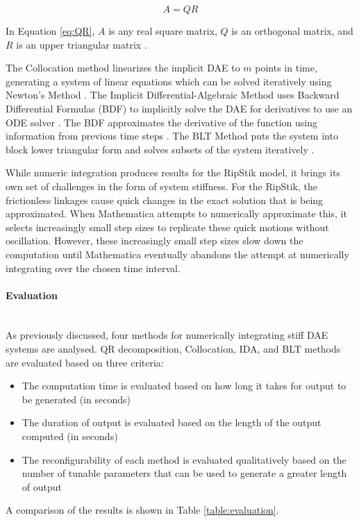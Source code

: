 \begin{equation}
\label{eq:QR}
A = QR
\end{equation}

In Equation \ref{eq:QR}, $A$ is any real square matrix, $Q$ is an orthogonal matrix, and $R$ is an upper triangular matrix \cite{Methods}.

The Collocation method linearizes the implicit DAE to $m$ points in time, generating a system of linear equations which can be solved iteratively using Newton's Method \cite{Methods}.
The Implicit Differential-Algebraic Method uses Backward Differential Formulas (BDF) to implicitly solve the DAE for derivatives to use an ODE solver \cite{Methods}. 
The BDF approximates the derivative of the function using information from previous time steps \cite{Methods}.
The BLT Method puts the system into block lower triangular form and solves subsets of the system iteratively \cite{Methods}.

While numeric integration produces results for the RipStik model, it brings its own set of challenges in the form of system stiffness.
For the RipStik, the frictionless linkages cause quick changes in the exact solution that is being approximated. 
When Mathematica attempts to numerically approximate this, it selects increasingly small step sizes to replicate these quick motions without oscillation. 
However, these increasingly small step sizes slow down the computation until Mathematica eventually abandons the attempt at numerically integrating over the chosen time interval.

\paragraph{Evaluation}\mbox{}\\
As previously discussed, four methods for numerically integrating stiff DAE systems are analysed. 
QR decomposition, Collocation, IDA, and BLT methods are evaluated based on three criteria:
\begin{itemize}
\item The computation time is evaluated based on how long it takes for output to be generated (in seconds)
\item The duration of output is evaluated based on the length of the output computed (in seconds)
\item The reconfigurability of each method is evaluated qualitatively based on the number of tunable parameters that can be used to generate a greater length of output
\end{itemize}
A comparison of the results is shown in Table \ref{table:evaluation}.

